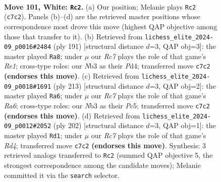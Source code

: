 \documentclass[11pt]{article}
\begin{document}
\clearpage

\begin{figure}[p]\centering
\begin{subfigure}{0.46\textwidth}\centering
\resizebox{\linewidth}{!}{%
\newchessgame
\chessboard[
  setfen={8/2R5/8/3k4/5K2/1N6/6P1/7r w - - 66 101},
  showmover=false,
  pgfstyle=straightmove, color=movearrow, markmove={c7-c2}
]}
\caption{}
\end{subfigure}\hfill
\begin{subfigure}{0.46\textwidth}\centering
\resizebox{\linewidth}{!}{%
\newchessgame
\chessboard[
  setfen={4r3/8/2R5/8/P2p4/5K2/3k4/8 b - - 0 96},
  showmover=false,
  pgfstyle=straightmove, color=movearrow, markmove={e8-a8}
]}
\caption{}
\end{subfigure}
\\[4pt]
\begin{subfigure}{0.46\textwidth}\centering
\resizebox{\linewidth}{!}{%
\newchessgame
\chessboard[
  setfen={8/3R4/8/2p1k3/8/r7/2K5/8 b - - 11 107},
  showmover=false,
  pgfstyle=straightmove, color=movearrow, markmove={a3-a6}
]}
\caption{}
\end{subfigure}\hfill
\begin{subfigure}{0.46\textwidth}\centering
\resizebox{\linewidth}{!}{%
\newchessgame
\chessboard[
  setfen={8/8/4k3/8/3R4/1P6/6r1/2K5 w - - 3 102},
  showmover=false,
  pgfstyle=straightmove, color=movearrow, markmove={d4-d1}
]}
\caption{}
\end{subfigure}
\caption{\textbf{Move 101, White: \texttt{Rc2}.} (a) Our position; Melanie plays \texttt{Rc2} (\texttt{c7c2}). Panels (b)--(d) are the retrieved master positions whose correspondence most drove this move (highest QAP objective among those that transfer to it). (b) Retrieved from \texttt{lichess\_elite\_2024-09\_p0016\#2484} (ply 191) [structural distance $d$=3, QAP obj=3]: the master played \texttt{Ra8}; under $\mu$ our \emph{Rc7} plays the role of that game's \emph{Re1}; cross-type roles: our \emph{N}b3 as their \emph{P}d4; transferred move \texttt{c7c2} \textbf{(endorses this move)}. (c) Retrieved from \texttt{lichess\_elite\_2024-09\_p0018\#1691} (ply 213) [structural distance $d$=3, QAP obj=2]: the master played \texttt{Ra6}; under $\mu$ our \emph{Rc7} plays the role of that game's \emph{Ra6}; cross-type roles: our \emph{N}b3 as their \emph{P}c5; transferred move \texttt{c7c2} \textbf{(endorses this move)}. (d) Retrieved from \texttt{lichess\_elite\_2024-09\_p0012\#2052} (ply 202) [structural distance $d$=3, QAP obj=1]: the master played \texttt{Rd1}; under $\mu$ our \emph{Rc7} plays the role of that game's \emph{Rd4}; transferred move \texttt{c7c2} \textbf{(endorses this move)}. Synthesis: 3 retrieved analogs transferred to \texttt{Rc2} (summed QAP objective 5, the strongest correspondence among the candidate moves); Melanie committed it via the \texttt{search} selector.}
\label{fig:thought-m200}
\end{figure}
\end{document}
